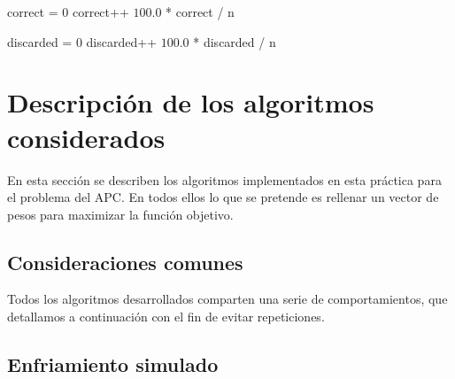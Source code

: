 \documentclass[12pt]{article}
\begin{document}
\begin{algorithm}[h!]
\begin{algorithmic}

    \State correct = $0$
      
            \State correct++
        \EndIf
    \EndFor
    \State \Return $100.0$ * correct / n
\EndFunction

\end{algorithmic}
\end{algorithm}

\vspace{-1em}

\begin{algorithm}[h!]
\begin{algorithmic}

    \State discarded = $0$
      
            \State discarded++
        \EndIf
    \EndFor
    \State \Return $100.0$ * discarded / n
\EndFunction

\end{algorithmic}
\end{algorithm}


\newpage
\section{Descripción de los algoritmos considerados}
En esta sección se describen los algoritmos implementados en esta práctica para el problema del APC. En todos ellos lo que se pretende es rellenar un vector de pesos para maximizar la función objetivo.

\subsection*{Consideraciones comunes}
\label{comunes}

Todos los algoritmos desarrollados comparten una serie de comportamientos, que detallamos a continuación con el fin de evitar repeticiones.\\

\subsection*{Enfriamiento simulado}
\label{es}
\end{document}
